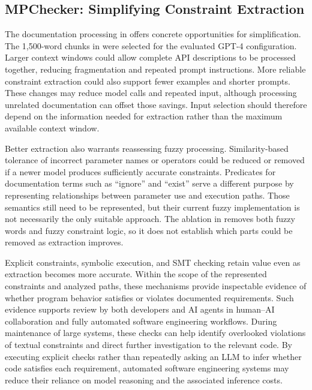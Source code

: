 \subsection{MPChecker: Simplifying Constraint Extraction}
The documentation processing in \toolchecker offers concrete opportunities for simplification. The 1,500-word chunks in  were selected for the evaluated GPT-4 configuration. Larger context windows could allow complete API descriptions to be processed together, reducing fragmentation and repeated prompt instructions. More reliable constraint extraction could also support fewer examples and shorter prompts. These changes may reduce model calls and repeated input, although processing unrelated documentation can offset those savings. Input selection should therefore depend on the information needed for extraction rather than the maximum available context window.

Better extraction also warrants reassessing fuzzy processing. Similarity-based tolerance of incorrect parameter names or operators could be reduced or removed if a newer model produces sufficiently accurate constraints. Predicates for documentation terms such as ``ignore'' and ``exist'' serve a different purpose by representing relationships between parameter use and execution paths. Those semantics still need to be represented, but their current fuzzy implementation is not necessarily the only suitable approach. The ablation in  removes both fuzzy words and fuzzy constraint logic, so it does not establish which parts could be removed as extraction improves.

Explicit constraints, symbolic execution, and SMT checking retain value even as extraction becomes more accurate. Within the scope of the represented constraints and analyzed paths, these mechanisms provide inspectable evidence of whether program behavior satisfies or violates documented requirements. Such evidence supports review by both developers and AI agents in human--AI collaboration and fully automated software engineering workflows. During maintenance of large systems, these checks can help identify overlooked violations of textual constraints and direct further investigation to the relevant code. By executing explicit checks rather than repeatedly asking an LLM to infer whether code satisfies each requirement, automated software engineering systems may reduce their reliance on model reasoning and the associated inference costs.
